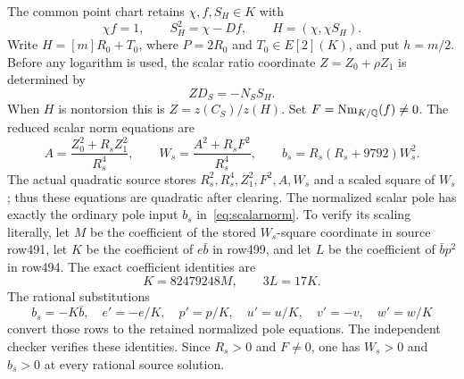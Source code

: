 \documentclass[11pt,a4paper]{article}
\newcommand{\Q}{\mathbb Q}\newcommand{\Z}{\mathbb Z}\newcommand{\HH}{\mathcal H}
\begin{document}
The common point chart retains $\chi,f,S_H\in K$ with
\begin{equation}\label{eq:Hchart}
                  \chi f=1,\qquad S_H^2=\chi-Df,
                  \qquad H=(\chi,\chi S_H).
\end{equation}
Write $H=[m]R_0+T_0$, where $P=2R_0$ and $T_0\in E[2](K)$,
and put $h=m/2$. Before any logarithm is used, the scalar ratio
coordinate $Z=Z_0+\rho Z_1$ is determined by
\[
                         ZD_S=-N_SS_H.
\]
When $H$ is nontorsion this is $Z=z(C_S)/z(H)$.
Set $F=\Nm_{K/\Q}(f)\ne0$. The reduced scalar norm equations are
\begin{equation}\label{eq:scalarnorm}
 A=\frac{Z_0^2+R_sZ_1^2}{R_s^4},\qquad
 W_s=\frac{A^2+R_sF^2}{R_s^4},\qquad
 b_s=R_s(R_s+9792)W_s^2.
\end{equation}
The actual quadratic source stores $R_s^2,R_s^4,Z_1^2,F^2,A,W_s$
and a scaled square of $W_s$; thus these equations are quadratic after
clearing. The normalized scalar pole has exactly the ordinary pole
input $b_s$ in~\eqref{eq:scalarnorm}. To verify its scaling literally,
let $M$ be the coefficient of the stored $W_s$-square coordinate in
source row491, let $K$ be the coefficient of $e\bar b$ in row499,
and let $L$ be the coefficient of $\bar b p^2$ in row494. The exact
coefficient identities are
\[
                  K=82479248M,\qquad 3L=17K.
\]
The rational substitutions
\[
 b_s=-K\bar b,\quad e'=-e/K,\quad p'=p/K,\quad
 u'=u/K,\quad v'=-v,\quad w'=w/K
\]
convert those rows to the retained normalized pole equations. The
independent checker verifies these identities. Since $R_s>0$ and
$F\ne0$, one has $W_s>0$ and $b_s>0$ at every rational source solution.
\end{document}
